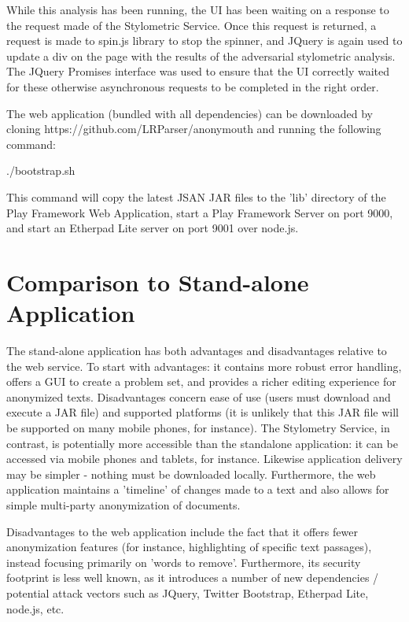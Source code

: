 \documentclass[letterpaper]{article}
\begin{document}
While this analysis has been running, the UI has been waiting on a
response to the request made of the Stylometric Service. Once this
request is returned, a request is made to spin.js library to stop the
spinner, and JQuery is again used to update a div on the page with the
results of the adversarial stylometric analysis. The JQuery Promises
interface was used to ensure that the UI correctly waited for these
otherwise asynchronous requests to be completed in the right order.

The web application (bundled with all dependencies) can be downloaded
by cloning https://github.com/LRParser/anonymouth and running the
following command:

./bootstrap.sh

This command will copy the latest JSAN JAR files to the 'lib'
directory of the Play Framework Web Application, start a Play
Framework Server on port 9000, and start an Etherpad Lite server on
port 9001 over node.js.

\section{Comparison to Stand-alone Application}

The stand-alone application has both advantages and disadvantages
relative to the web service. To start with advantages: it contains
more robust error handling, offers a GUI to create a problem set, and
provides a richer editing experience for anonymized
texts. Disadvantages concern ease of use (users must download and
execute a JAR file) and supported platforms (it is unlikely that this
JAR file will be supported on many mobile phones, for instance). The
Stylometry Service, in contrast, is potentially more accessible than
the standalone application: it can be accessed via mobile phones and
tablets, for instance. Likewise application delivery may be simpler -
nothing must be downloaded locally. Furthermore, the web application
maintains a 'timeline' of changes made to a text and also allows for
simple multi-party anonymization of documents.

Disadvantages to the web application include the fact that it offers fewer anonymization
features (for instance, highlighting of specific text passages),
instead focusing primarily on 'words to remove'. Furthermore, its
security footprint is less well known, as it introduces a number of
new dependencies / potential attack vectors such as JQuery, Twitter
Bootstrap, Etherpad Lite, node.js, etc.
\end{document}

